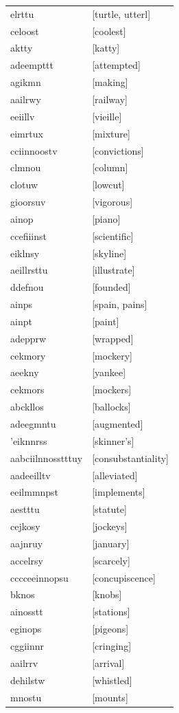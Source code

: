\documentclass{article}
\begin{document}
\begin{tabular}{ll}
elrttu & [turtle, utterl] \\
celoost & [coolest] \\
aktty & [katty] \\
adeempttt & [attempted] \\
agikmn & [making] \\
aailrwy & [railway] \\
eeiillv & [vieille] \\
eimrtux & [mixture] \\
cciinnoostv & [convictions] \\
clmnou & [column] \\
clotuw & [lowcut] \\
gioorsuv & [vigorous] \\
ainop & [piano] \\
ccefiiinst & [scientific] \\
eiklnsy & [skyline] \\
aeillrsttu & [illustrate] \\
ddefnou & [founded] \\
ainps & [spain, pains] \\
ainpt & [paint] \\
adepprw & [wrapped] \\
cekmory & [mockery] \\
aeekny & [yankee] \\
cekmors & [mockers] \\
abckllos & [ballocks] \\
adeegmntu & [augmented] \\
'eiknnrss & [skinner's] \\
aabciilnnosstttuy & [consubstantiality] \\
aadeeilltv & [alleviated] \\
eeilmmnpst & [implements] \\
aestttu & [statute] \\
cejkosy & [jockeys] \\
aajnruy & [january] \\
accelrsy & [scarcely] \\
cccceeinnopsu & [concupiscence] \\
bknos & [knobs] \\
ainosstt & [stations] \\
eginops & [pigeons] \\
cggiinnr & [cringing] \\
aailrrv & [arrival] \\
dehilstw & [whistled] \\
mnostu & [mounts] \\

\end{tabular}
\end{document}
